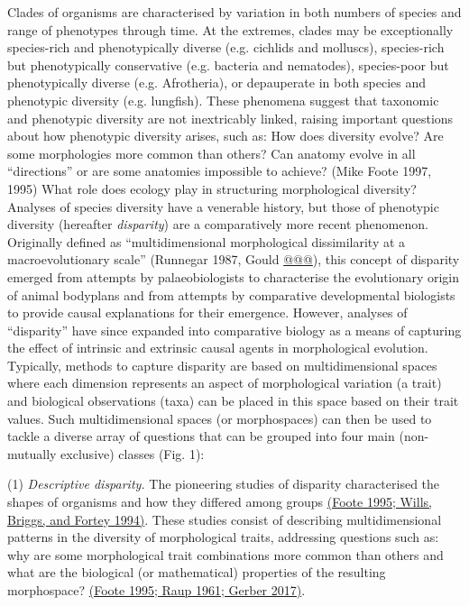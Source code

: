 \documentclass[12pt,letterpaper]{article}
\begin{document}
Clades of organisms are characterised by variation in both numbers of species and range of phenotypes through time.
At the extremes, clades may be exceptionally species-rich and phenotypically diverse (e.g. cichlids and molluscs), species-rich but phenotypically conservative (e.g. bacteria and nematodes), species-poor but phenotypically diverse (e.g. Afrotheria), or depauperate in both species and phenotypic diversity (e.g. lungfish).
These phenomena suggest that taxonomic and phenotypic diversity are not inextricably linked, raising important questions about how phenotypic diversity arises, such as:
How does diversity evolve?
Are some morphologies more common than others?
Can anatomy evolve in all ``directions'' or are some anatomies impossible to achieve? (Mike Foote 1997, 1995)
What role does ecology play in structuring morphological diversity?
Analyses of species diversity have a venerable history, but those of phenotypic diversity (hereafter \emph{disparity}) are a comparatively more recent phenomenon. Originally defined as ``multidimensional morphological dissimilarity at a macroevolutionary scale'' (Runnegar 1987, Gould \href{https://paperpile.com/c/sTGYvp/Uns3}{@@@}),
 this concept of disparity emerged from attempts by palaeobiologists to characterise the evolutionary origin of animal bodyplans and from attempts by comparative developmental biologists to provide causal explanations for their emergence.
However, analyses of ``disparity'' have since expanded into comparative biology as a means of capturing the effect of intrinsic and extrinsic causal agents in morphological evolution.
Typically, methods to capture disparity are based on multidimensional spaces where each dimension represents an aspect of morphological variation (a trait) and biological observations (taxa) can be placed in this space based on their trait values.
Such multidimensional spaces (or morphospaces) can then be used to tackle a diverse array of questions that can be grouped into four main (non-mutually exclusive) classes (Fig. 1):

(1) \emph{Descriptive disparity.} The pioneering studies of disparity characterised the shapes of organisms and how they differed among groups \href{https://paperpile.com/c/sTGYvp/fTJ3+eZ3F}{(Foote 1995; Wills, Briggs, and Fortey 1994)}.
These studies consist of describing multidimensional patterns in the diversity of morphological traits, addressing questions such as: why are some morphological trait combinations more common than others and what are the biological (or mathematical) properties of the resulting morphospace? \href{https://paperpile.com/c/sTGYvp/fTJ3+I0Ic+QVvv}{(Foote 1995; Raup 1961; Gerber 2017)}.
\end{document}

